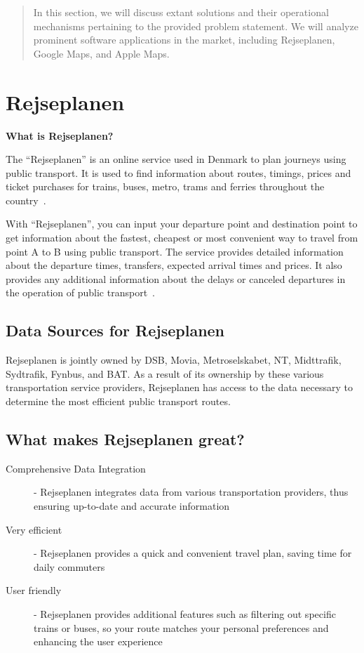 \begin{abstract}
    In this section, we will discuss extant solutions and their operational mechanisms pertaining to the provided
    problem statement.
    We will analyze prominent software applications in the market, including Rejseplanen, Google Maps, and Apple Maps.
\end{abstract}


\section{Rejseplanen}\label{sec:rejseplanen}

\textbf{What is Rejseplanen?}

The ``Rejseplanen'' is an online service used in Denmark to plan journeys using public transport.
It is used to find information about routes, timings, prices and ticket purchases for trains, buses, metro, trams and
ferries throughout the country~\cite{rejseplanen2023}. \newline

With ``Rejseplanen'', you can input your departure point and destination point to get information about the fastest,
cheapest or most convenient way to travel from point A to B using public transport.
The service provides detailed information about the departure times, transfers, expected arrival times and prices.
It also provides any additional information about the delays or canceled departures in the operation of public
transport~\cite{rejseplanen2023}.\newline

\subsection{Data Sources for Rejseplanen}\label{subsec:where-does-rejseplanen-get-their-data-from?}

Rejseplanen is jointly owned by DSB, Movia, Metroselskabet, NT, Midttrafik, Sydtrafik, Fynbus, and BAT\@.
As a result of its ownership by these various transportation service providers, Rejseplanen has access to the data
necessary to determine the most efficient public transport routes.

\subsection{What makes Rejseplanen great?}\label{subsec:what-makes-rejseplanen-great?}
\begin{description}
    \item [Comprehensive Data Integration] - Rejseplanen integrates data from various transportation providers, thus
    ensuring up-to-date and accurate information
    \item [Very efficient] - Rejseplanen provides a quick and convenient travel plan, saving time for daily commuters
    \item [User friendly] - Rejseplanen provides additional features such as filtering out specific trains or buses, so
    your route matches your personal preferences and enhancing the user experience
\end{description}


